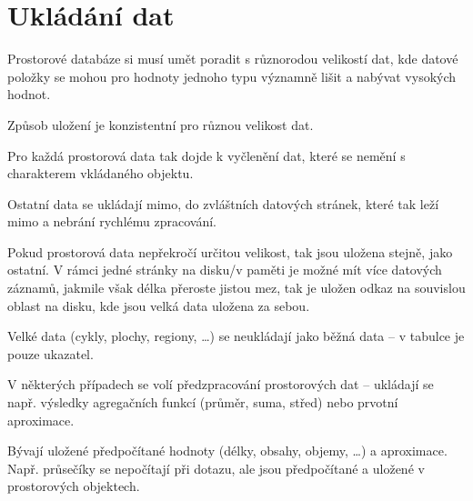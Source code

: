 \section{Ukládání dat}

\begin{compactitem}
    \item Prostorové databáze si musí umět poradit s různorodou velikostí dat, kde datové položky se mohou pro hodnoty jednoho typu významně lišit a nabývat vysokých hodnot.

    \item Způsob uložení je konzistentní pro různou velikost dat. \begin{compactitem}
        \item Pro každá prostorová data tak dojde k vyčlenění dat, které se nemění s charakterem vkládaného objektu.
        \item Ostatní data se ukládají mimo, do zvláštních datových stránek, které tak leží mimo a nebrání rychlému zpracování.
    \end{compactitem}

    \item Pokud prostorová data nepřekročí určitou velikost, tak jsou uložena stejně, jako ostatní. V rámci jedné stránky na disku/v paměti je možné mít více datových záznamů, jakmile však délka přeroste jistou mez, tak je uložen odkaz na souvislou oblast na disku, kde jsou velká data uložena za sebou.

    \item Velké data (cykly, plochy, regiony, \ldots) se neukládají jako běžná data -- v tabulce je pouze ukazatel.

    \item V některých případech se volí předzpracování prostorových dat -- ukládají se např. výsledky agregačních funkcí (průměr, suma, střed) nebo prvotní aproximace.

    \item Bývají uložené předpočítané hodnoty (délky, obsahy, objemy, \ldots) a aproximace. Např. průsečíky se nepočítají při dotazu, ale jsou předpočítané a uložené v prostorových objektech.
\end{compactitem}
